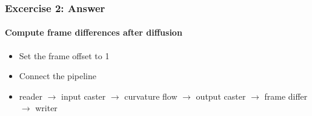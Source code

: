 {
\begin{frame}[fragile]
\frametitle{Excercise 2: Answer}
\framesubtitle{Compute frame differences after diffusion}
\begin{itemize}
\item Set the frame offset to 1
\pause

\item Connect the pipeline
\item reader $\rightarrow$ input caster $\rightarrow$ curvature flow
  $\rightarrow$ output caster $\rightarrow$ frame differ $\rightarrow$ writer
\end{itemize}
\end{frame}
}

